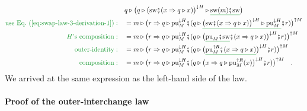 \begin{align*}
 & q\triangleright\big(q\triangleright\big(\text{sw}\bef(x\Rightarrow q\triangleright x)\big)^{\downarrow H}\triangleright\gunderline{\text{sw}(m)\bef\text{sw}}\big)\\
{\color{greenunder}\text{use Eq.~(\ref{eq:swap-law-3-derivation-1})}:}\quad & =m\triangleright\big(r\Rightarrow q\triangleright\text{pu}_{M}^{\downarrow H}\bef(q\triangleright\gunderline{\big(\text{sw}\bef(x\Rightarrow q\triangleright x)\big)^{\downarrow H}\triangleright\text{pu}_{M}^{\downarrow H}}\bef r)\big)^{\uparrow M}\\
{\color{greenunder}H\text{'s composition}:}\quad & =m\triangleright\big(r\Rightarrow q\triangleright\text{pu}_{M}^{\downarrow H}\bef(q\triangleright\big(\gunderline{\text{pu}_{M}\bef\text{sw}}\bef(x\Rightarrow q\triangleright x)\big)^{\downarrow H}\bef r)\big)^{\uparrow M}\\
{\color{greenunder}\text{outer-identity}:}\quad & =m\triangleright\big(r\Rightarrow q\triangleright\text{pu}_{M}^{\downarrow H}\bef(q\triangleright\big(\gunderline{\text{pu}_{M}^{\uparrow R}\bef(x\Rightarrow q\triangleright x)}\big)^{\downarrow H}\bef r)\big)^{\uparrow M}\\
{\color{greenunder}\text{composition}:}\quad & =m\triangleright\big(r\Rightarrow q\triangleright\text{pu}_{M}^{\downarrow H}\bef(q\triangleright\big(x\Rightarrow q\triangleright\text{pu}_{M}^{\uparrow R}(x)\big)^{\downarrow H}\bef r)\big)^{\uparrow M}\quad.
\end{align*}
We arrived at the same expression as the left-hand side of the law.

\paragraph{Proof of the outer-interchange law}

